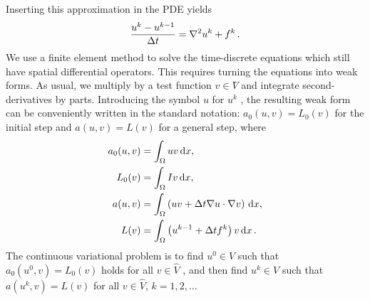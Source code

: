 Inserting this approximation in the PDE yields
\begin{equation}
{{u^k - u^{k-1}\over{\Delta t}} = \nabla^2 u^k + f^k\thinspace .}
\end{equation}
We use a finite element method to solve the time-discrete equations which still have spatial differential operators. This requires turning the equations into weak forms. As usual, we multiply by a test function $v\in V̂$ and integrate second-derivatives by parts. Introducing the symbol $u$ for $u^k$ , the resulting weak form can be conveniently written in the standard notation: $a_0(u,v)=L_0(v)$ for the initial step and $a(u,v)=L(v)$ for a general step, where
\begin{eqnarray}
\begin{split}a_0(u,v) &= \int_\Omega uv \, \mathrm{d}x, \\
L_0(v) &= \int_\Omega Iv \, \mathrm{d}x, \\
a(u,v) &= \int_\Omega\left( uv + {\Delta t}
\nabla u\cdot \nabla v\right) \, \mathrm{d}x, \\
L(v) &= \int_\Omega \left(u^{k-1} + {\Delta t}  f^k\right)v \, \mathrm{d}x\thinspace .\end{split}
\end{eqnarray}
The continuous variational problem is to find $u^0\in V$ such that $a_0(u^0,v)=L_0(v)$ holds for all $v\in \hat{V}$ , and then find $u^k\in V$ such that $a(u^k,v)=L(v)$ for all $v\in\hat{V}$, $k=1,2,…$
\pagebreak
